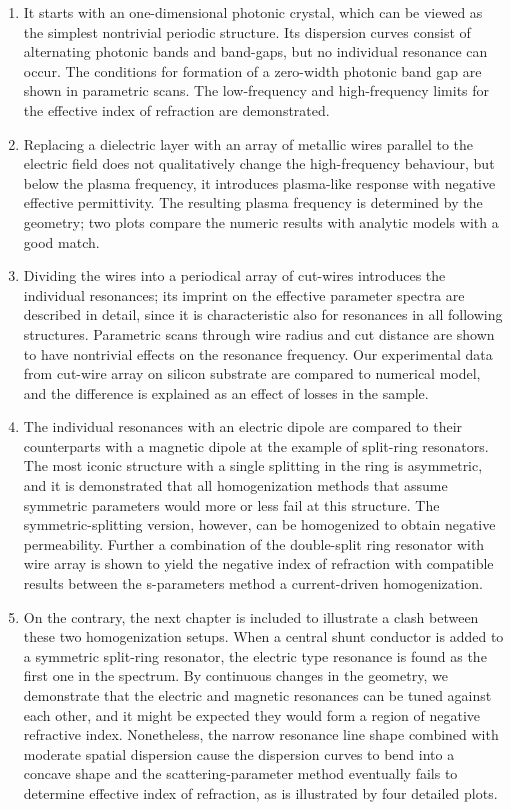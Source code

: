 \begin{enumerate}
\item{It starts with an one-dimensional photonic crystal, which can be viewed as the simplest nontrivial periodic structure. Its dispersion curves consist of alternating photonic bands and band-gaps, but no individual resonance can occur. The conditions for formation of a zero-width photonic band gap are shown in parametric scans. The low-frequency and high-frequency limits for the effective index of refraction are demonstrated.
} 
\item{Replacing a dielectric layer with an array of metallic wires parallel to the electric field does not qualitatively change the high-frequency behaviour, but below the plasma frequency, it introduces plasma-like response with negative effective permittivity. The resulting plasma frequency is determined by the geometry; two plots compare the numeric results with analytic models with a good match.
} 
\item{Dividing the wires into a periodical array of cut-wires introduces the individual resonances; its imprint on the effective parameter spectra are described in detail, since it is characteristic also for resonances in all following structures. Parametric scans through wire radius and cut distance are shown to have nontrivial effects on the resonance frequency. Our experimental data from cut-wire array on silicon substrate are compared to numerical model, and the difference is explained as an effect of losses in the sample. 
} 
\item{The individual resonances with an electric dipole are compared to their counterparts with a magnetic dipole at the example of split-ring resonators. The most iconic structure with a single splitting in the ring is asymmetric, and it is demonstrated that all homogenization methods that assume symmetric parameters would more or less fail at this structure. The symmetric-splitting version, however, can be homogenized to obtain negative permeability. Further a combination of the double-split ring resonator with wire array is shown to yield the negative index of refraction with compatible results between the s-parameters method a current-driven homogenization.
} 
\item{On the contrary, the next chapter is included to illustrate a clash between these two homogenization setups. When a central shunt conductor is added to a symmetric split-ring resonator, the electric type resonance is found as the first one in the spectrum. By continuous changes in the geometry, we demonstrate that the electric and magnetic resonances can be tuned against each other, and it might be expected they would form a region of negative refractive index. Nonetheless, the narrow resonance line shape combined with moderate spatial dispersion cause the dispersion curves to bend into a concave shape and the scattering-parameter method eventually fails to determine effective index of refraction, as is illustrated by four detailed plots.
}
\end{enumerate}
